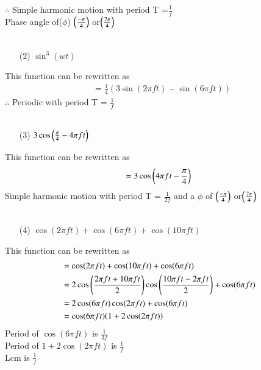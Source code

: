 \documentclass[journal,12pt,twocolumn]{IEEEtran}
\theoremstyle{remark}
\begin{document}
 $\therefore$ Simple harmonic motion with period {T} =$\frac{1}{f}$\\ Phase angle of($\phi$) $\left(\frac{-\pi}{4}\right)$ or$\left(\frac{7\pi}{4}\right)$\\
\\
\begin{enumerate}
    \item[(2)] $\sin^3(wt)$\\
\end{enumerate}
 This function can be rewritten as\\ 
 \begin{align}
  &=\frac{1}{4}(3\sin(2\pi f t)-\sin(6\pi  f t))
 \end{align}
 $\therefore$ Periodic with period {T} = $\frac{1}{f}$ \\
\\
\begin{enumerate}
    \item[(3)] $3\cos\left(\frac{\pi}{4}-4\pi f t\right)$\\
\end{enumerate}
This function can be rewritten as\\ 
 \begin{align}
  =3\cos\left(4\pi f t-\frac{\pi}{4}\right)\\
 \end{align}
 Simple harmonic motion with period {T} = $\frac{1}{2f}$  and a $\phi$ of  $\left(\frac{-\pi}{4}\right)$ or$\left(\frac{7\pi}{4}\right)$\\
 \\
 \begin{enumerate}
 \item[(4)]  $\cos(2\pi f t)+\cos(6\pi  f t)+\cos(10\pi  f t)$\\
\end{enumerate}
This function can be rewritten as\\ 
 \begin{align}
  &=\cos(2\pi f t)+\cos(10\pi  f t)+\cos(6\pi  f t)\\
  &=2\cos\left(\frac{2\pi f t+10\pi f t}{2}\right)\cos\left(\frac{10\pi  f t-2\pi f t}{2}\right) +\cos(6\pi  f t)\\
  &=2\cos(6\pi  f t) \cos(2\pi f t)+\cos(6\pi  f t)\\
  &=\cos(6\pi  f t) (1+2\cos(2\pi f t))
 \end{align}
 Period of $\cos(6\pi  f t)$ is $\frac{1}{3f}$\\ 
 Period of $1+2\cos(2\pi f t)$ is $\frac{1}{f}$\\ 
 Lcm is $\frac{1}{f}$\\
\end{document}
